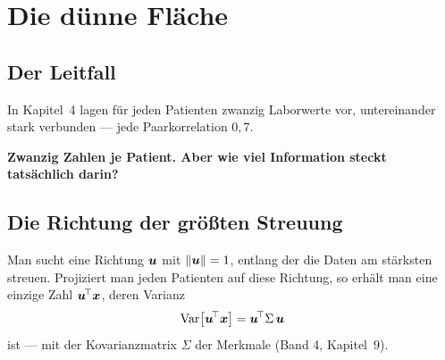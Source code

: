 \chapter{Die dünne Fläche}

\section{Der Leitfall}

\begin{merksatz}
In Kapitel~4 lagen für jeden Patienten zwanzig Laborwerte vor, untereinander stark verbunden --- jede Paarkorrelation $0{,}7$.

\begin{center}
\begin{minipage}{0.9\textwidth}
\textbf{Zwanzig Zahlen je Patient. Aber wie viel Information steckt tatsächlich darin?}
\end{minipage}
\end{center}

\begin{center}
\begin{minipage}{0.88\textwidth}
\end{minipage}
\end{center}
\end{merksatz}

\section{Die Richtung der größten Streuung}

\begin{merksatz}
Man sucht eine Richtung $\boldsymbol{u}$ mit $\|\boldsymbol{u}\| = 1$, entlang der die Daten am stärksten streuen. Projiziert man jeden Patienten auf diese Richtung, so erhält man eine einzige Zahl $\boldsymbol{u}^{\!\top}\boldsymbol{x}$, deren Varianz
\[ \operatorname{Var}\bigl[\boldsymbol{u}^{\!\top}\boldsymbol{x}\bigr] = \boldsymbol{u}^{\!\top}\Sigma\,\boldsymbol{u} \]
ist --- mit der Kovarianzmatrix $\Sigma$ der Merkmale (Band 4, Kapitel~9).
\end{merksatz}

